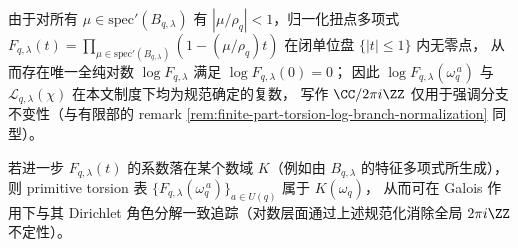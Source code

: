 \begin{remark}[扭点对数分支的规范化与代数可核验性]\label{rem:pom-schur-dirichlet-log-branch-normalization}
由于对所有 \(\mu\in\mathrm{spec}'(B_{q,\lambda})\) 有 \(|\mu/\rho_q|<1\)，归一化扭点多项式
\(
F_{q,\lambda}(t)=\prod_{\mu\in\mathrm{spec}'(B_{q,\lambda})}(1-(\mu/\rho_q)t)
\)
在闭单位盘 \(\{|t|\le1\}\) 内无零点，
从而存在唯一全纯对数 \(\log F_{q,\lambda}\) 满足 \(\log F_{q,\lambda}(0)=0\)；
因此 \(\log F_{q,\lambda}(\omega_q^{\,a})\) 与 \(\mathcal{L}_{q,\lambda}(\chi)\) 在本文制度下均为规范确定的复数，
写作 \(\CC/2\pi i\ZZ\) 仅用于强调分支不变性（与有限部的 remark \ref{rem:finite-part-torsion-log-branch-normalization} 同型）。
\par
若进一步 \(F_{q,\lambda}(t)\) 的系数落在某个数域 \(K\)（例如由 \(B_{q,\lambda}\) 的特征多项式所生成），则 primitive torsion 表
\(\{F_{q,\lambda}(\omega_q^{\,a})\}_{a\in U(q)}\) 属于 \(K(\omega_q)\)，
从而可在 Galois 作用下与其 Dirichlet 角色分解一致追踪（对数层面通过上述规范化消除全局 \(2\pi i\ZZ\) 不定性）。
\end{remark}

